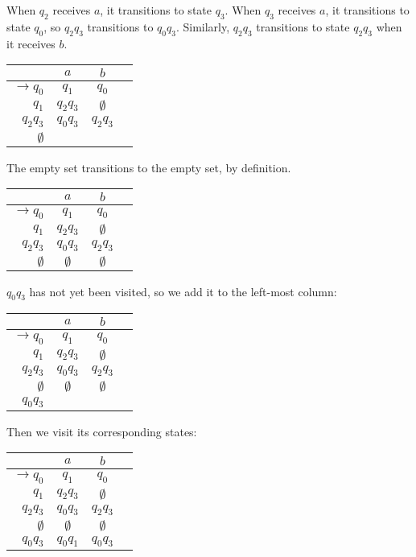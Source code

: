 When $q_2$ receives $a$, it transitions to state $q_3$. When $q_3$ receives $a$, it transitions to state $q_0$, so $q_2q_3$ transitions to $q_0q_3$. Similarly, $q_2q_3$ transitions to state $q_2q_3$ when it receives $b$.

\begin{center}\begin{tabular}{r|c c r}
         & $a$ & $b$ & \\\hline
    $\to q_0$ & $q_1$ & $q_0$ &  \\
          $q_1$ & $q_2q_3$ & $\emptyset$ & \\
          $q_2q_3$ & $q_0q_3$ & $q_2q_3$ & \\
          $\emptyset$ & & &
\end{tabular}\end{center}

The empty set transitions to the empty set, by definition. 

\begin{center}\begin{tabular}{r|c c r}
         & $a$ & $b$ & \\\hline
    $\to q_0$ & $q_1$ & $q_0$ &  \\
          $q_1$ & $q_2q_3$ & $\emptyset$ & \\
          $q_2q_3$ & $q_0q_3$ & $q_2q_3$ & \\
          $\emptyset$ & $\emptyset$ & $\emptyset$ &
\end{tabular}\end{center}

$q_0q_3$ has not yet been visited, so we add it to the left-most column:

\begin{center}\begin{tabular}{r|c c r}
         & $a$ & $b$ & \\\hline
    $\to q_0$ & $q_1$ & $q_0$ &  \\
          $q_1$ & $q_2q_3$ & $\emptyset$ & \\
          $q_2q_3$ & $q_0q_3$ & $q_2q_3$ & \\
          $\emptyset$ & $\emptyset$ & $\emptyset$ &\\
          $q_0q_3$ & & & 
\end{tabular}\end{center}

Then we visit its corresponding states:

\begin{center}\begin{tabular}{r|c c r}
         & $a$ & $b$ & \\\hline
    $\to q_0$ & $q_1$ & $q_0$ &  \\
          $q_1$ & $q_2q_3$ & $\emptyset$ & \\
          $q_2q_3$ & $q_0q_3$ & $q_2q_3$ & \\
          $\emptyset$ & $\emptyset$ & $\emptyset$ &\\
          $q_0q_3$ & $q_0q_1$ & $q_0q_3$ & 
\end{tabular}\end{center}

